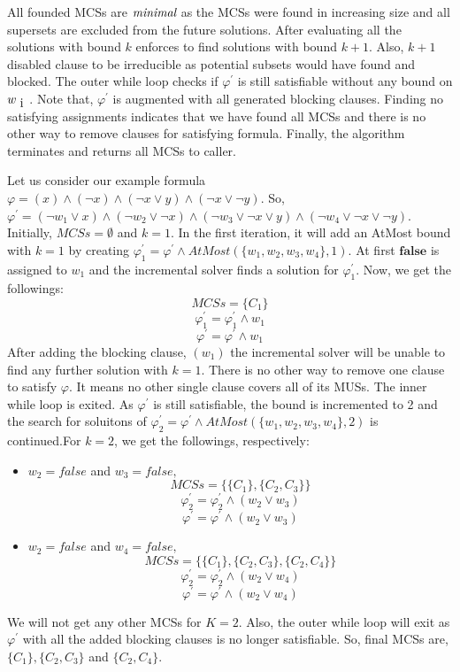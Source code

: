 All founded MCSs are $\emph{minimal}$ as the MCSs were found in increasing size and all supersets are excluded from the future solutions. After evaluating all the solutions with bound $k$ enforces to find solutions with bound $k+1$. Also, $k+1$ disabled clause to be irreducible as potential subsets would have found and blocked.\newline
The outer while loop checks if $\varphi^{\prime}$ is still satisfiable without any bound on $w_{\text i}$. Note that, $\varphi^{\prime}$ is augmented with all  generated blocking clauses. Finding no satisfying assignments indicates that we have found all MCSs and there is no other way to remove clauses for satisfying formula. Finally, the algorithm terminates and returns all MCSs to caller.
\begin{example}
Let us consider our example formula $\varphi=(x)\wedge(\neg x)\wedge(\neg x\vee y)\wedge(\neg x \vee \neg y)$. So, $\varphi^{\prime}=(\neg w_{1}\vee x)\wedge(\neg w_{2}\vee \neg x)\wedge(\neg w_{3}\vee \neg x\vee y)\wedge(\neg w_{4}\vee \neg x \vee \neg y)$. Initially, $MCSs=\emptyset$ and $k=1$.\newline
In the first iteration, it will add an AtMost bound with $k=1$ by creating $\varphi^{\prime}_{1}=\varphi^{\prime} \wedge AtMost(\{w_{1},w_{2},w_{3},w_{4}\},1)$. At first $\mathbf{false}$ is assigned to $w_{1}$ and the incremental solver finds a solution for $\varphi^{\prime}_{1}$. Now, we get the followings:
$$MCSs=\{C_{1}\}$$
$$\varphi^{\prime}_{1}=\varphi^{\prime}_{1} \wedge w_{1}$$
$$\varphi^{\prime}=\varphi^{\prime} \wedge w_{1}$$
After adding the blocking clause, $(w_{1})$ the incremental solver will be unable to find any further solution with $k=1$. There is no other way to remove one clause to satisfy $\varphi$. It means no other single clause covers all of its MUSs. The inner while loop is exited.\newline
As $\varphi^{\prime}$ is still satisfiable, the bound is incremented to 2 and the search for soluitons of $\varphi^{\prime}_{2}=\varphi^{\prime} \wedge AtMost(\{w_{1},w_{2},w_{3},w_{4}\},2)$ is continued.For $k=2$, we get the followings, respectively:
\begin{itemize}
	\item $w_{2}=false$ and $w_{3}=false,$
	$$MCSs=\{\{C_{1}\}, \{C_{2}, C_{3}\}\}$$
	$$\varphi^{\prime}_{2}=\varphi^{\prime}_{2} \wedge (w_{2}\vee w_{3})$$
	$$\varphi^{\prime}=\varphi^{\prime} \wedge (w_{2}\vee w_{3})$$
	\item $w_{2}=false$ and $w_{4}=false,$
	$$MCSs=\{\{C_{1}\}, \{C_{2}, C_{3}\}, \{C_{2}, C_{4}\}\}$$
	$$\varphi^{\prime}_{2}=\varphi^{\prime}_{2} \wedge (w_{2}\vee w_{4})$$
	$$\varphi^{\prime}=\varphi^{\prime} \wedge (w_{2}\vee w_{4})$$
\end{itemize}
We will not get any other MCSs for $K=2$. Also, the outer while loop will exit as $\varphi^{\prime}$ with all the added blocking clauses is no longer satisfiable. So, final MCSs are, $\{C_{1}\}, \{C_{2}, C_{3}\}$ and $\{C_{2}, C_{4}\}$.
\end{example}
